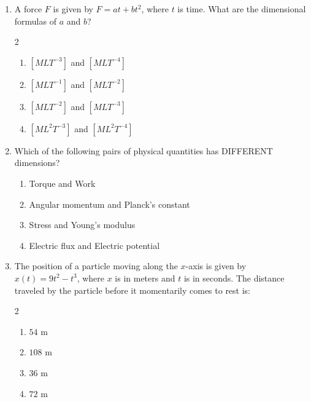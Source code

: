 \documentclass[11pt,a4paper]{article}
\begin{document}
\begin{enumerate}[label=\textbf{\textcolor{l2Amber}{Q\arabic*.}},leftmargin=24pt,itemsep=10pt,start=26]
  \item A force $F$ is given by $F = a t + b t^2$, where $t$ is time. What are the dimensional formulas of $a$ and $b$?
  \begin{multicols}{2}
  \begin{enumerate}[label=\textbf{\textcolor{primaryDark}{(\Alph*)}},itemsep=2pt]
    \item $[M L T^{-3}]$ and $[M L T^{-4}]$
    \item $[M L T^{-1}]$ and $[M L T^{-2}]$
    \item $[M L T^{-2}]$ and $[M L T^{-3}]$
    \item $[M L^2 T^{-3}]$ and $[M L^2 T^{-4}]$
  \end{enumerate}
  \end{multicols}

  \item Which of the following pairs of physical quantities has DIFFERENT dimensions?
  \begin{enumerate}[label=\textbf{\textcolor{primaryDark}{(\Alph*)}},itemsep=2pt]
    \item Torque and Work
    \item Angular momentum and Planck's constant
    \item Stress and Young's modulus
    \item Electric flux and Electric potential
  \end{enumerate}

  \item The position of a particle moving along the $x$-axis is given by $x(t) = 9t^2 - t^3$, where $x$ is in meters and $t$ is in seconds. The distance traveled by the particle before it momentarily comes to rest is:
  \begin{multicols}{2}
  \begin{enumerate}[label=\textbf{\textcolor{primaryDark}{(\Alph*)}},itemsep=2pt]
    \item $54\text{ m}$
    \item $108\text{ m}$
    \item $36\text{ m}$
    \item $72\text{ m}$
  \end{enumerate}
  \end{multicols}


\end{enumerate}
\end{document}
